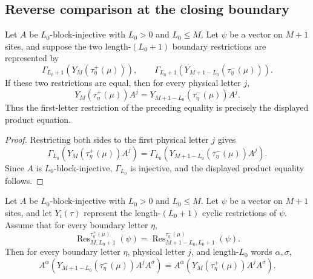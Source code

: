 \subsection{Reverse comparison at the closing boundary}\label{subsec:normal_boundary_closing_reverse}

\begin{lemma}
    \label{lem:closure_property_boundary_first_products_restrictions}
    \leanok
    Let $A$ be $L_0$-block-injective with $L_0>0$ and $L_0\le M$. Let
    $\psi$ be a vector on $M+1$ sites, and suppose the two length-$(L_0+1)$
    boundary restrictions are represented by
    \[
        \Gamma_{L_0+1}(Y_M(\tau^+_\eta(\mu))),
        \qquad
        \Gamma_{L_0+1}(Y_{M+1-L_0}(\tau^-_\eta(\mu))).
    \]
    If these two restrictions are equal, then for every physical letter $j$,
    \[
        Y_M(\tau^+_\eta(\mu))A^j
        =
        Y_{M+1-L_0}(\tau^-_\eta(\mu))A^j .
    \]
    Thus the first-letter restriction of the preceding equality is precisely the
    displayed product equation.
\end{lemma}

\begin{proof}
    \leanok
    Restricting both sides to the first physical letter $j$ gives
    \[
        \Gamma_{L_0}\!\left(Y_M(\tau^+_\eta(\mu))A^j\right)
        =
        \Gamma_{L_0}\!\left(Y_{M+1-L_0}(\tau^-_\eta(\mu))A^j\right).
    \]
    Since $A$ is $L_0$-block-injective, $\Gamma_{L_0}$ is injective, and the
    displayed product equality follows.
\end{proof}

\begin{lemma}
    \label{lem:closure_property_wrapped_mirror_left_word_products_boundary_restrictions}
    \leanok
    Let $A$ be $L_0$-block-injective with $L_0>0$ and $L_0\le M$. Let
    $\psi$ be a vector on $M+1$ sites, and let $Y_i(\tau)$ represent the
    length-$(L_0+1)$ cyclic restrictions of $\psi$. Assume that for every
    boundary letter $\eta$,
    \[
        \operatorname{Res}^{\tau^+_\eta(\mu)}_{M,L_0+1}(\psi)
        =
        \operatorname{Res}^{\tau^-_\eta(\mu)}_{M+1-L_0,L_0+1}(\psi).
    \]
    Then for every boundary letter $\eta$, physical letter $j$, and
    length-$L_0$ words $\alpha,\sigma$,
    \[
        A^\alpha
        \left(Y_{M+1-L_0}(\tau^-_\eta(\mu))A^jA^\sigma\right)
        =
        A^\alpha
        \left(Y_M(\tau^+_\eta(\mu))A^jA^\sigma\right).
    \]
\end{lemma}

